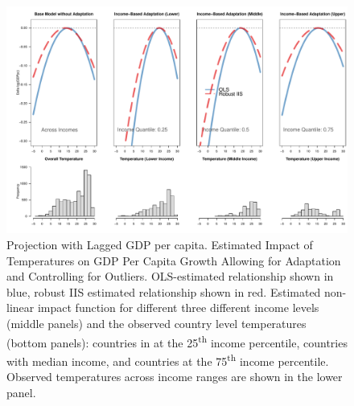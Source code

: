 \documentclass[11pt, letterpaper]{article}
\numberwithin{algorithm}{section}
\numberwithin{assumption}{section}
\numberwithin{lemma}{section}
\numberwithin{theorem}{section}
\numberwithin{corollary}{section}
\numberwithin{remark}{section}
\numberwithin{equation}{section}
\numberwithin{figure}{section}
\numberwithin{table}{section}
\begin{document}
\begin{figure}[!htbp]  %
\centering
\includegraphics[width = \textwidth]{eff.adapt.L1.v2.pdf}
\caption{Projection with Lagged GDP per capita. Estimated Impact of Temperatures on GDP Per Capita Growth Allowing for Adaptation and Controlling for Outliers. OLS-estimated relationship shown in blue, robust IIS estimated relationship shown in red. Estimated non-linear impact function for different three different income levels (middle panels) and the observed country level temperatures (bottom panels): countries in at the 25\textsuperscript{th} income percentile, countries with median income, and countries at the 75\textsuperscript{th} income percentile. Observed temperatures across income ranges are shown in the lower panel. }
\label{fig_dist_app1_appendix}
\end{figure}
\end{document}
